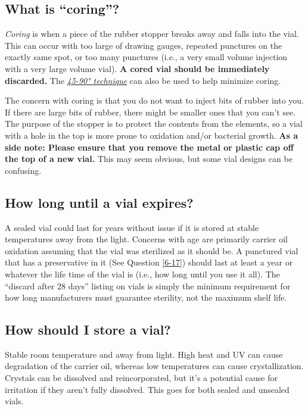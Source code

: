 \documentclass{article}
\begin{document}
\subsection{What is “coring”?}\label{5-23}

\textit{Coring} is when a piece of the rubber stopper breaks away and falls into the vial. This can occur with too large of drawing gauges, repeated punctures on the exactly same spot, or too many punctures (i.e., a very small volume injection with a very large volume vial). \textbf{A cored vial should be immediately discarded. }The \href{https://www.youtube.com/watch?v=w5F0SLoMjC8}{\textit{45-90° technique}} can also be used to help minimize coring.

The concern with coring is that you do not want to inject bits of rubber into you. If there are large bits of rubber, there might be smaller ones that you can't see. The purpose of the stopper is to protect the contents from the elements, so a vial with a hole in the top is more prone to oxidation and/or bacterial growth. \textbf{As a side note: Please ensure that you remove the metal or plastic cap off the top of a new vial. }This may seem obvious, but some vial designs can be confusing. 

\subsection{How long until a vial expires?}

A sealed vial could last for years without issue if it is stored at stable temperatures away from the light. Concerns with age are primarily carrier oil oxidation assuming that the vial was sterilized as it should be. A punctured vial that has a preservative in it (See Question \ref{6-17}) should last at least a year or whatever the life time of the vial is (i.e., how long until you use it all). The “discard after 28 days” listing on vials is simply the minimum requirement for how long manufacturers must guarantee sterility, not the maximum shelf life. 

\subsection{How should I store a vial?}

Stable room temperature and away from light. High heat and UV can cause degradation of the carrier oil, whereas low temperatures can cause crystallization. Crystals can be dissolved and reincorporated, but it’s a potential cause for irritation if they aren’t fully dissolved. This goes for both sealed and unsealed vials.
\end{document}
